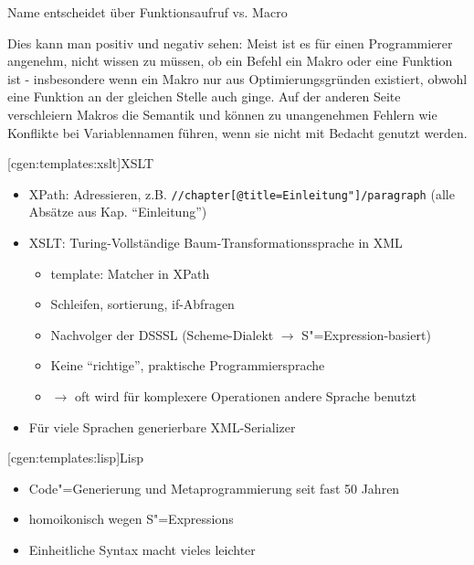 \documentclass[a4paper, bibgerm]{book}
\newcommand\icode[1]{\lstinline?#1?}
\newcommand\lsubsection{}
\newcommand{\sexp}{S"=Expression}
\newcommand{\sexps}{S"=Expressions}
\newcommand{\cgen}{Code"=Generierung}
\begin{document}
Name entscheidet über Funktionsaufruf vs. Macro

Dies kann man positiv und negativ sehen: Meist ist es für einen
Programmierer angenehm, nicht wissen zu müssen, ob ein Befehl ein Makro
oder eine Funktion ist - insbesondere wenn ein Makro nur aus
Optimierungsgründen existiert, obwohl eine Funktion an der gleichen
Stelle auch ginge. Auf der anderen Seite verschleiern Makros die
Semantik und können zu unangenehmen Fehlern wie Konflikte bei
Variablennamen führen, wenn sie nicht mit Bedacht genutzt werden.

\lsubsection[cgen:templates:xslt]{XSLT}
\begin{itemize}
\item XPath: Adressieren, z.B. \icode{//chapter[@title=Einleitung"]/paragraph}
  (alle Absätze aus Kap. ``Einleitung'')
\item XSLT: Turing-Vollständige Baum-Transformationssprache in XML
  \begin{itemize}
  \item template: Matcher in XPath
  \item Schleifen, sortierung, if-Abfragen
  \item Nachvolger der DSSSL (Scheme-Dialekt $\rightarrow$ \sexp{}-basiert)
  \item Keine ``richtige'', praktische Programmiersprache
  \item $\rightarrow$ oft wird für komplexere Operationen andere Sprache benutzt
  \end{itemize}
\item Für viele Sprachen generierbare XML-Serializer
\end{itemize}

\lsubsection[cgen:templates:lisp]{Lisp}

\begin{itemize}
\item \cgen{} und Metaprogrammierung seit fast 50 Jahren
\item homoikonisch wegen \sexps{}
\item Einheitliche Syntax macht vieles leichter
\end{itemize}
\end{document}
